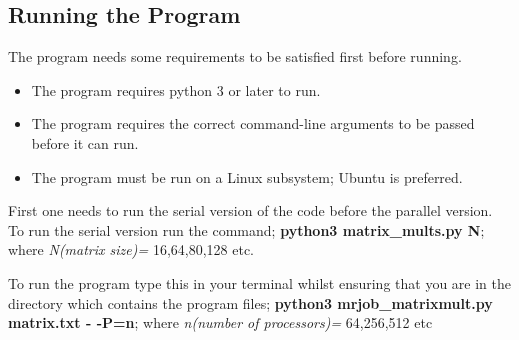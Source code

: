 \documentclass[12pt, a4paper, fleqn, titlepage]{article}
\begin{document}
\subsection*{Running the Program}
    The program needs some requirements to be satisfied first before running.
    \begin{itemize}
        \item The program requires python 3 or later to run.
        \item The program requires the correct command-line arguments to be passed before it can run.
        \item The program must be run on a Linux subsystem; Ubuntu is preferred.
    \end{itemize}
    First one needs to run the serial version of the code before the parallel version. To run the serial version run the command; \textbf{python3 matrix\_mults.py N}; where \emph{N(matrix size)=} 16,64,80,128 etc.

    To run the program type this in your terminal whilst ensuring that you are in the directory which contains the program files;
    \textbf{python3 mrjob\_matrixmult.py matrix.txt - -P=n}; where \emph{n(number of processors)=} 64,256,512 etc
\end{document}
